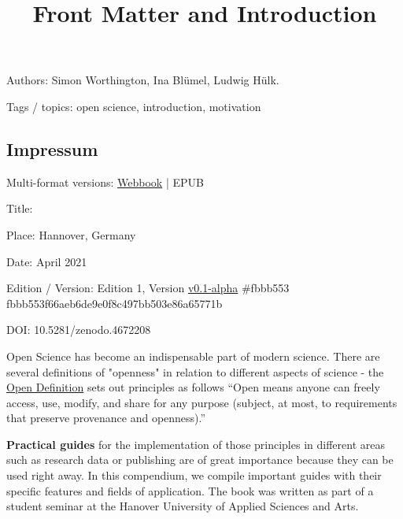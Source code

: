 \documentclass{article}
\begin{document}
\title{Front Matter and Introduction}

\maketitle


Authors: Simon Worthington, Ina Blümel, Ludwig Hülk.


Tags / topics: open science, introduction, motivation


\subsection{Impressum}\label{H8810070}



Multi-format versions: \href{https://vivliostyle.vercel.app/#src=https://tibhannover.github.io/Open-Science-Guides-Collection/html/index.html&bookMode=true}{Webbook} | EPUB


Title: 


Place: Hannover, Germany


Date: April 2021


Edition / Version: Edition 1, Version \href{https://github.com/TIBHannover/Open-Science-Guides-Collection/releases/tag/v0.1-alpha}{v0.1-alpha} \#fbbb553 fbbb553f66aeb6de9e0f8c497bb503e86a65771b


DOI: 10.5281/zenodo.4672208


Open Science has become an indispensable part of modern science. There are several definitions of "openness" in relation to different aspects of science - the \href{https://opendefinition.org/}{Open Definition} sets out principles as follows “Open means anyone can freely access, use, modify, and share for any purpose (subject, at most, to requirements that preserve provenance and openness).” 


\textbf{Practical guides} for the implementation of those principles in different areas such as research data or publishing are of great importance because they can be used right away. In this compendium, we compile important guides with their specific features and fields of application. The book was written as part of a student seminar at the Hanover University of Applied Sciences and Arts.
\end{document}
